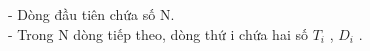 - Dòng đầu tiên chứa số N.   
\\   - Trong N dòng tiếp theo, dòng thứ i chứa hai số $T_{i}$   , $D_{i}$   .
